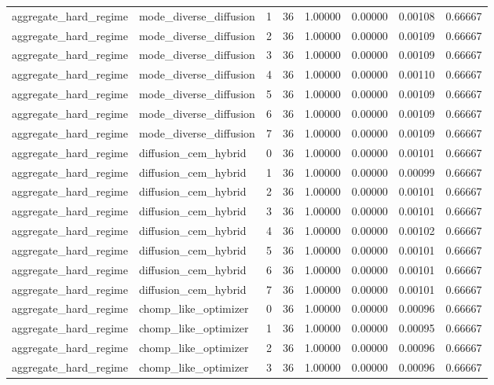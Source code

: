 \documentclass{article}
\begin{document}
\begin{table}[tbp]
{\begin{tabular}{llllllll}
aggregate\_hard\_regime & mode\_diverse\_diffusion & 1 & 36 & 1.00000 & 0.00000 & 0.00108 & 0.66667 \\
aggregate\_hard\_regime & mode\_diverse\_diffusion & 2 & 36 & 1.00000 & 0.00000 & 0.00109 & 0.66667 \\
aggregate\_hard\_regime & mode\_diverse\_diffusion & 3 & 36 & 1.00000 & 0.00000 & 0.00109 & 0.66667 \\
aggregate\_hard\_regime & mode\_diverse\_diffusion & 4 & 36 & 1.00000 & 0.00000 & 0.00110 & 0.66667 \\
aggregate\_hard\_regime & mode\_diverse\_diffusion & 5 & 36 & 1.00000 & 0.00000 & 0.00109 & 0.66667 \\
aggregate\_hard\_regime & mode\_diverse\_diffusion & 6 & 36 & 1.00000 & 0.00000 & 0.00109 & 0.66667 \\
aggregate\_hard\_regime & mode\_diverse\_diffusion & 7 & 36 & 1.00000 & 0.00000 & 0.00109 & 0.66667 \\
aggregate\_hard\_regime & diffusion\_cem\_hybrid & 0 & 36 & 1.00000 & 0.00000 & 0.00101 & 0.66667 \\
aggregate\_hard\_regime & diffusion\_cem\_hybrid & 1 & 36 & 1.00000 & 0.00000 & 0.00099 & 0.66667 \\
aggregate\_hard\_regime & diffusion\_cem\_hybrid & 2 & 36 & 1.00000 & 0.00000 & 0.00101 & 0.66667 \\
aggregate\_hard\_regime & diffusion\_cem\_hybrid & 3 & 36 & 1.00000 & 0.00000 & 0.00101 & 0.66667 \\
aggregate\_hard\_regime & diffusion\_cem\_hybrid & 4 & 36 & 1.00000 & 0.00000 & 0.00102 & 0.66667 \\
aggregate\_hard\_regime & diffusion\_cem\_hybrid & 5 & 36 & 1.00000 & 0.00000 & 0.00101 & 0.66667 \\
aggregate\_hard\_regime & diffusion\_cem\_hybrid & 6 & 36 & 1.00000 & 0.00000 & 0.00101 & 0.66667 \\
aggregate\_hard\_regime & diffusion\_cem\_hybrid & 7 & 36 & 1.00000 & 0.00000 & 0.00101 & 0.66667 \\
aggregate\_hard\_regime & chomp\_like\_optimizer & 0 & 36 & 1.00000 & 0.00000 & 0.00096 & 0.66667 \\
aggregate\_hard\_regime & chomp\_like\_optimizer & 1 & 36 & 1.00000 & 0.00000 & 0.00095 & 0.66667 \\
aggregate\_hard\_regime & chomp\_like\_optimizer & 2 & 36 & 1.00000 & 0.00000 & 0.00096 & 0.66667 \\
aggregate\_hard\_regime & chomp\_like\_optimizer & 3 & 36 & 1.00000 & 0.00000 & 0.00096 & 0.66667 \\
\bottomrule
\end{tabular}
}
\end{table}
\end{document}
